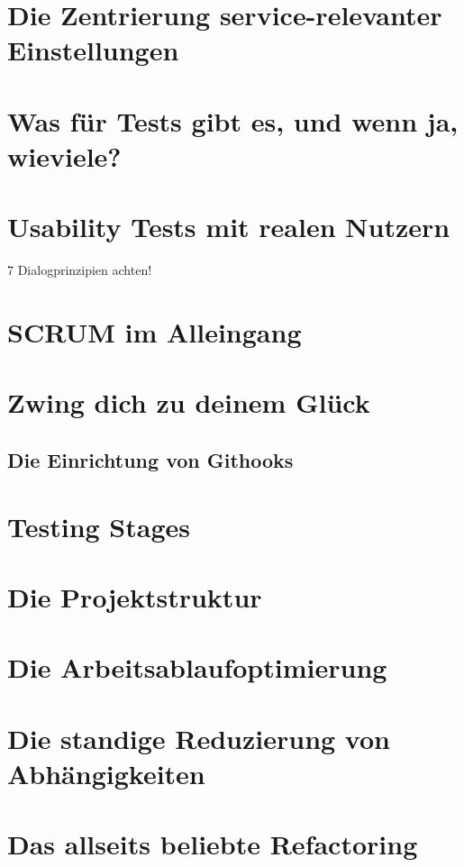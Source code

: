 \section{Die Zentrierung service-relevanter Einstellungen}

\section{Was für Tests gibt es, und wenn ja, wieviele?}

\section{Usability Tests mit realen Nutzern}
7 Dialogprinzipien achten!
\section{SCRUM im Alleingang}

\section{Zwing dich zu deinem Glück}

\subsection{Die Einrichtung von Githooks}
\section{Testing Stages}

\section{Die Projektstruktur}

\section{Die Arbeitsablaufoptimierung}

\section{Die standige Reduzierung von Abhängigkeiten}

\section{Das allseits beliebte Refactoring}

